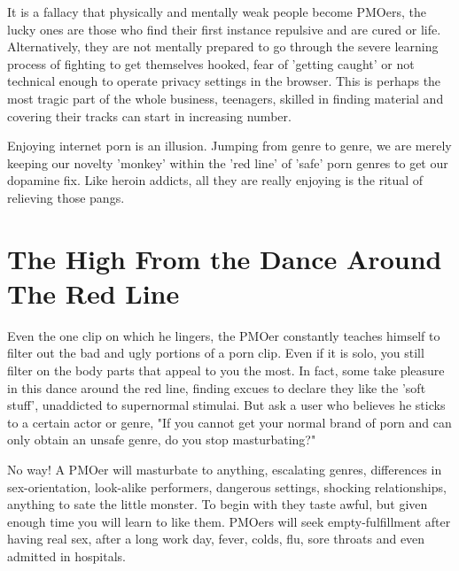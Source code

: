 \documentclass[easypeasy.tex]{subfiles}
\begin{document}
It is a fallacy that physically and mentally weak people become PMOers, the lucky ones are those who find their first instance repulsive and are cured or life. Alternatively, they are not mentally prepared to go through the severe learning process of fighting to get themselves hooked, fear of 'getting caught' or not technical enough to operate privacy settings in the browser. This is perhaps the most tragic part of the whole business, teenagers, skilled in finding material and covering their tracks can start in increasing number.

Enjoying internet porn is an illusion. Jumping from genre to genre, we are merely keeping our novelty 'monkey' within the 'red line' of 'safe' porn genres to get our dopamine fix. Like heroin addicts, all they are really enjoying is the ritual of relieving those pangs.

    \section{The High From the Dance Around The Red Line}
Even the one clip on which he lingers, the PMOer constantly teaches himself to filter out the bad and ugly portions of a porn clip. Even if it is solo, you still filter on the body parts that appeal to you the most. In fact, some take pleasure in this dance around the red line, finding excues to declare they like the 'soft stuff', unaddicted to supernormal stimulai. But ask a user who believes he sticks to a certain actor or genre, "If you cannot get your normal brand of porn and can only obtain an unsafe genre, do you stop masturbating?"

No way! A PMOer will masturbate to anything, escalating genres, differences in sex-orientation, look-alike performers, dangerous settings, shocking relationships, anything to sate the little monster. To begin with they taste awful, but given enough time you will learn to like them. PMOers will seek empty-fulfillment after having real sex, after a long work day, fever, colds, flu, sore throats and even admitted in hospitals.
\end{document}
